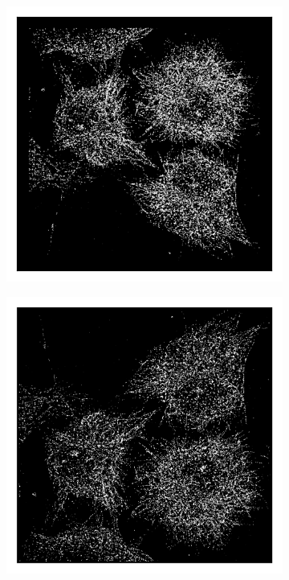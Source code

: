 \begin{figure}
    \begin{subfigure}{0.32\textwidth}
        \includegraphics[width=\textwidth]{figures/test_scatter.png}
        \caption{}
    \end{subfigure}
    \begin{subfigure}{0.32\textwidth}
        \includegraphics[width=\textwidth]{figures/test_imshow.png}

\end{subfigure}
\end{figure}
